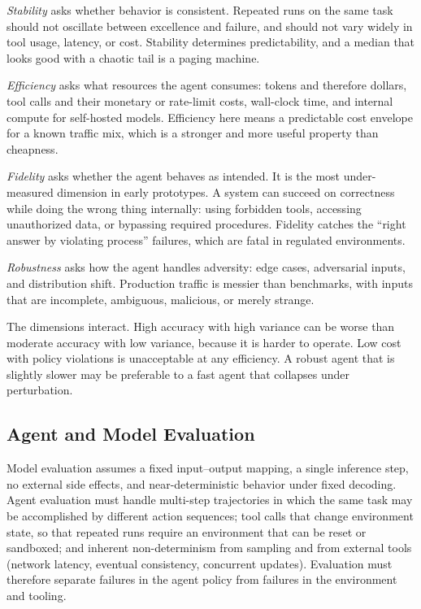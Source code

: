 \documentclass[11pt]{book}
\begin{document}
\textit{Stability} asks whether behavior is consistent. Repeated runs on the same task should not oscillate between excellence and failure, and should not vary widely in tool usage, latency, or cost. Stability determines predictability, and a median that looks good with a chaotic tail is a paging machine.

\textit{Efficiency} asks what resources the agent consumes: tokens and therefore dollars, tool calls and their monetary or rate-limit costs, wall-clock time, and internal compute for self-hosted models. Efficiency here means a predictable cost envelope for a known traffic mix, which is a stronger and more useful property than cheapness.

\textit{Fidelity} asks whether the agent behaves as intended. It is the most under-measured dimension in early prototypes. A system can succeed on correctness while doing the wrong thing internally: using forbidden tools, accessing unauthorized data, or bypassing required procedures. Fidelity catches the ``right answer by violating process'' failures, which are fatal in regulated environments.

\textit{Robustness} asks how the agent handles adversity: edge cases, adversarial inputs, and distribution shift. Production traffic is messier than benchmarks, with inputs that are incomplete, ambiguous, malicious, or merely strange.

The dimensions interact. High accuracy with high variance can be worse than moderate accuracy with low variance, because it is harder to operate. Low cost with policy violations is unacceptable at any efficiency. A robust agent that is slightly slower may be preferable to a fast agent that collapses under perturbation.

\subsection{Agent and Model Evaluation}

Model evaluation assumes a fixed input--output mapping, a single inference step, no external side effects, and near-deterministic behavior under fixed decoding. Agent evaluation must handle multi-step trajectories in which the same task may be accomplished by different action sequences; tool calls that change environment state, so that repeated runs require an environment that can be reset or sandboxed; and inherent non-determinism from sampling and from external tools (network latency, eventual consistency, concurrent updates). Evaluation must therefore separate failures in the agent policy from failures in the environment and tooling.
\end{document}
